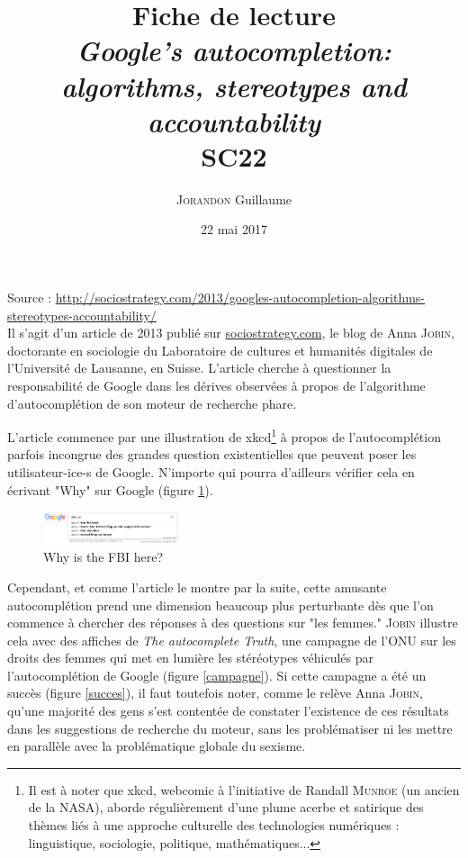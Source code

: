 \documentclass[a4paper,12pt]{article}
\author{\textsc{Jorandon} Guillaume}
\date{22 mai 2017}
\title{Fiche de lecture\\\large{\textit{Google’s autocompletion: algorithms, stereotypes and accountability}}\\\normalsize{SC22}}
\begin{document}
\maketitle

Source : \url{http://sociostrategy.com/2013/googles-autocompletion-algorithms-stereotypes-accountability/}\\

Il s'agit d'un article de 2013 publié sur \url{sociostrategy.com}, le blog de Anna \textsc{Jobin}, doctorante en sociologie du Laboratoire de cultures et humanités digitales de l'Université de Lausanne, en Suisse. L'article cherche à questionner la responsabilité de Google dans les dérives observées à propos de l'algorithme d'autocomplétion de son moteur de recherche phare.

L'article commence par une illustration de xkcd\footnote{Il est à noter que xkcd, webcomic à l'initiative de Randall \textsc{Munroe} (un ancien de la NASA), aborde régulièrement d'une plume acerbe et satirique des thèmes liés à une approche culturelle des technologies numériques : linguistique, sociologie, politique, mathématiques...} à propos de l'autocomplétion parfois incongrue des grandes question existentielles que peuvent poser les utilisateur-ice-s de Google. N'importe qui pourra d'ailleurs vérifier cela en écrivant "Why" sur Google (figure \ref{why}).

\begin{figure}[ht]
 \begin{center}
  \includegraphics[width=150px]{why.png}
 \end{center}
 \caption{Why is the FBI here?}
 \label{why}
\end{figure}

Cependant, et comme l'article le montre par la suite, cette amusante autocomplétion prend une dimension beaucoup plus perturbante dès que l'on commence à chercher des réponses à des questions sur "les femmes." \textsc{Jobin} illustre cela avec des affiches de \textit{The autocomplete Truth}, une campagne de l'ONU sur les droits des femmes qui met en lumière les stéréotypes véhiculés par l'autocomplétion de Google (figure \ref{campagne}). Si cette campagne a été un succès (figure \ref{succes}), il faut toutefois noter, comme le relève Anna \textsc{Jobin}, qu'une majorité des gens s'est contentée de constater l'existence de ces résultats dans les suggestions de recherche du moteur, sans les problématiser ni les mettre en parallèle avec la problématique globale du sexisme.
\end{document}

